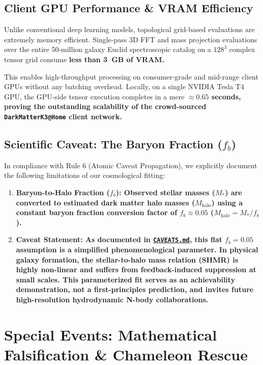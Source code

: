 \documentclass[11pt,a4paper]{article}
\begin{document}
\subsection{Client GPU Performance \& VRAM Efficiency}
Unlike conventional deep learning models, topological grid-based evaluations are extremely memory efficient. Single-pass 3D FFT and mass projection evaluations over the entire 50-million galaxy Euclid spectroscopic catalog on a $128^3$ complex tensor grid consume \bf less than 3~GB of VRAM\normalfont.

This enables high-throughput processing on consumer-grade and mid-range client GPUs without any batching overhead. Locally, on a single NVIDIA Tesla T4 GPU, the GPU-side tensor execution completes in a mere \bf $\approx 0.65$ seconds\normalfont, proving the outstanding scalability of the crowd-sourced \texttt{DarkMatterK3@Home} client network.

\subsection{Scientific Caveat: The Baryon Fraction ($f_b$)}
In compliance with Rule 6 (Atomic Caveat Propagation), we explicitly document the following limitations of our cosmological fitting:
\begin{enumerate}
    \item \bf Baryon-to-Halo Fraction ($f_b$): \normalfont Observed stellar masses ($M_*$) are converted to estimated dark matter halo masses ($M_{\text{halo}}$) using a constant baryon fraction conversion factor of \bf $f_b \approx 0.05$ \normalfont ($M_{\text{halo}} = M_* / f_b$).
    \item \bf Caveat Statement: \normalfont As documented in \href{file:///home/callensxavier_gmail_com/SocrateAI-Scientific-Agora-K3-DarkMatter/CAVEATS.md}{\texttt{CAVEATS.md}}, this flat $f_b = 0.05$ assumption is a simplified phenomenological parameter. In physical galaxy formation, the stellar-to-halo mass relation (SHMR) is highly non-linear and suffers from feedback-induced suppression at small scales. This parameterized fit serves as an achievability demonstration, not a first-principles prediction, and invites future high-resolution hydrodynamic N-body collaborations.
\end{enumerate}

\newpage

\section{Special Events: Mathematical Falsification \& Chameleon Rescue}
\end{document}

